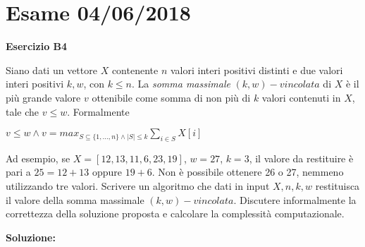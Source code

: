 \documentclass[../cheatSheetAlgoritmi.tex]{subfiles}
\begin{document}
\section{Esame 04/06/2018}
\textbf{Esercizio B4}

Siano dati un vettore $X$ contenente $n$ valori interi positivi distinti e due valori interi positivi $k, w$, con $k \leq n$. La \emph{somma massimale} $(k, w)-vincolata$ di $X$ è il più grande valore $v$ ottenibile come somma di non più di $k$ valori contenuti in $X$, tale che $v \leq w$. Formalmente
\begin{center}
	$v \leq w \land v = max_{S \subseteq \{1, ..., n\} \land \mid S \mid \leq k} \sum_{i \in S} X[i]$\\
\end{center}
Ad esempio, se $X = [12,13,11,6,23,19]$, $w = 27$, $k= 3$, il valore da restituire è pari a $25 = 12 + 13$ oppure $19 + 6$. Non è possibile ottenere 26 o 27, nemmeno utilizzando tre valori. Scrivere un algoritmo che dati in input $X,n,k,w$ restituisca il valore della somma massimale $(k, w)-vincolata$. Discutere informalmente la correttezza della   soluzione proposta e calcolare la complessità computazionale.

\textbf{Soluzione:}
\end{document}
